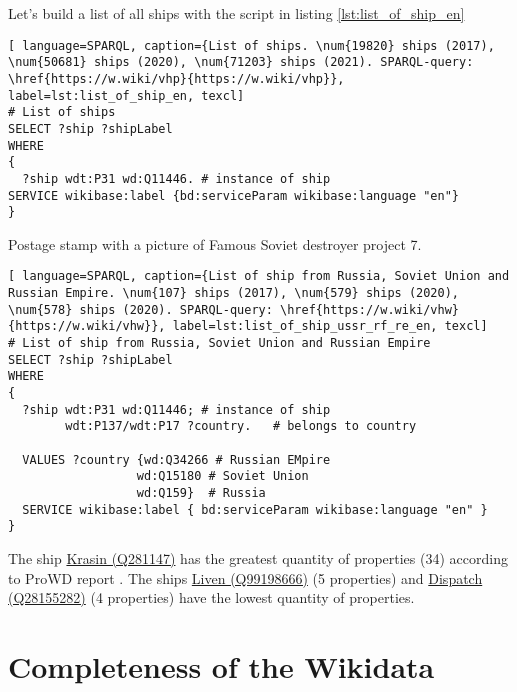 Let's build a list of all ships with the script in listing \ref{lst:list_of_ship_en}


\begin{lstlisting}[ language=SPARQL, caption={List of ships. \num{19820} ships (2017), \num{50681} ships (2020), \num{71203} ships (2021). SPARQL-query: \href{https://w.wiki/vhp}{https://w.wiki/vhp}}, label=lst:list_of_ship_en, texcl]
# List of ships
SELECT ?ship ?shipLabel
WHERE
{
  ?ship wdt:P31 wd:Q11446. # instance of ship
SERVICE wikibase:label {bd:serviceParam wikibase:language "en"}
}
\end{lstlisting}


\begin{marginfigure}[0.0cm]
  {
    \setlength{\fboxsep}{0pt}%
    \setlength{\fboxrule}{1pt}%
  }
  \caption[Soviet destroyer project 7]{Postage stamp with a picture of Famous Soviet destroyer project 7.}%
  \label{fig:quiz_question_ship}%
\end{marginfigure}
\label{question:ship_1}
  
\begin{lstlisting}[ language=SPARQL, caption={List of ship from Russia, Soviet Union and Russian Empire. \num{107} ships (2017), \num{579} ships (2020), \num{578} ships (2020). SPARQL-query: \href{https://w.wiki/vhw}{https://w.wiki/vhw}}, label=lst:list_of_ship_ussr_rf_re_en, texcl]
# List of ship from Russia, Soviet Union and Russian Empire
SELECT ?ship ?shipLabel
WHERE
{
  ?ship wdt:P31 wd:Q11446; # instance of ship
        wdt:P137/wdt:P17 ?country.   # belongs to country
    
  VALUES ?country {wd:Q34266 # Russian EMpire
                  wd:Q15180 # Soviet Union
                  wd:Q159}  # Russia
  SERVICE wikibase:label { bd:serviceParam wikibase:language "en" }
}
\end{lstlisting}

The ship \href{https://www.wikidata.org/wiki/Q281147}{Krasin (Q281147)} has the greatest quantity of properties (34) according to ProWD report . The ships \href{https://www.wikidata.org/wiki/Q99198666}{Liven (Q99198666)} (5 properties) and \href{https://www.wikidata.org/wiki/Q28155282}{Dispatch (Q28155282)} (4 properties) have the lowest quantity of properties.


\section{Completeness of the Wikidata}

